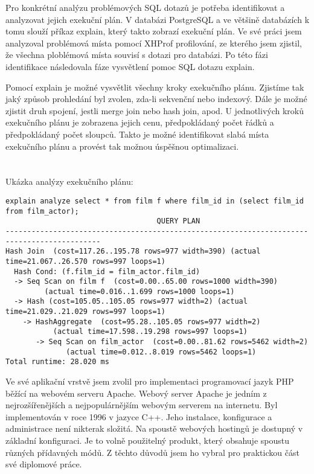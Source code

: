 \documentclass[12pt]{article}
\begin{document}
Pro konkrétní analýzu problémových SQL dotazů je potřeba identifikovat a analyzovat jejich exekuční plán. V databázi PostgreSQL a ve většině databázích k tomu slouží příkaz explain, který takto zobrazí exekuční plán. Ve své práci jsem analyzoval problémová místa pomocí XHProf profilování, ze kterého jsem zjistil, že všechna ploblémová místa souvisí s dotazi pro databázi. Po této fázi identifikace následovala fáze vysvětlení pomoc SQL dotazu explain.

Pomocí explain je možné vysvětlit všechny kroky exekučního plánu. Zjistíme tak jaký způsob prohledání byl zvolen, zda-li sekvenční nebo indexový. Dále je možné zjistit druh spojení, jestli merge join nebo hash join, apod. U jednotlivých kroků exekučního plánu je zobrazena jejich cenu, předpokládaný počet řádků a předpokládaný počet sloupců. Takto je možné identifikovat slabá místa exekučního plánu a provést tak možnou úspěšnou optimalizaci.\\
\\
\\ Ukázka analýzy exekučního plánu:
\begin{scriptsize}
\begin{verbatim}
explain analyze select * from film f where film_id in (select film_id from film_actor);
                                   QUERY PLAN
--------------------------------------------------------------------------------------------
Hash Join  (cost=117.26..195.78 rows=977 width=390) (actual time=21.067..26.570 rows=997 loops=1)
  Hash Cond: (f.film_id = film_actor.film_id)
  -> Seq Scan on film f  (cost=0.00..65.00 rows=1000 width=390) 
  	     (actual time=0.016..1.699 rows=1000 loops=1)
  -> Hash (cost=105.05..105.05 rows=977 width=2) (actual time=21.029..21.029 rows=997 loops=1)
    -> HashAggregate  (cost=95.28..105.05 rows=977 width=2) 
           (actual time=17.598..19.298 rows=997 loops=1)
       -> Seq Scan on film_actor  (cost=0.00..81.62 rows=5462 width=2) 
              (actual time=0.012..8.019 rows=5462 loops=1)
Total runtime: 28.020 ms
\end{verbatim}
\end{scriptsize}


Ve své aplikační vrstvě jsem zvolil pro implementaci programovací jazyk PHP běžící na webovém serveru Apache.
Webový server Apache je jedním z nejrozšířenějších a nejpopulárnějším webovým serverem na internetu. Byl implementován v roce 1996 v jazyce C++. Jeho instalace, konfigurace a administrace není nikterak složitá. Na spoustě webových hostingů je dostupný v základní konfiguraci. Je to volně použitelný produkt, který obsahuje spoustu různých přídavných módů. Z těchto důvodů jsem ho vybral pro praktickou část své diplomové práce.
\end{document}
